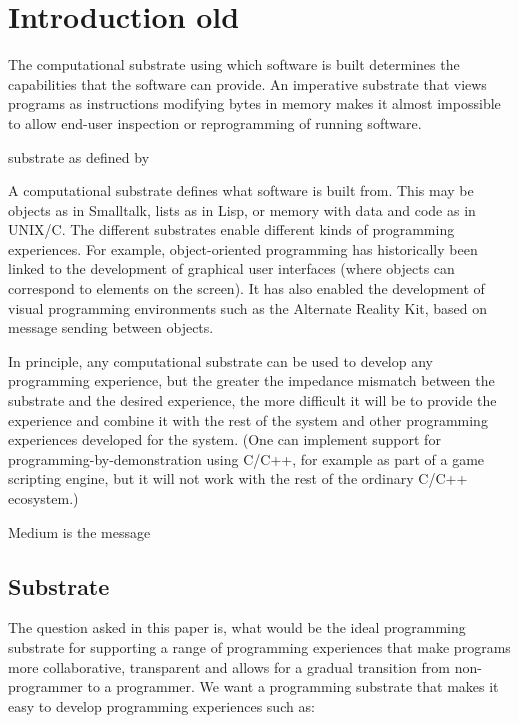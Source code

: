 \documentclass[sigconf,anonymous,screen]{acmart}
\begin{document}
\newpage

\section{Introduction old}

The computational substrate using which software is built determines the capabilities that the
software can provide. An imperative substrate that views programs as instructions modifying
bytes in memory makes it almost impossible to allow end-user inspection or reprogramming of
running software.

substrate as defined by \cite{jakubovic-2022-ladder}


A computational substrate defines what software is built from. This may be objects as in
Smalltalk, lists as in Lisp, or memory with data and code as in UNIX/C.
The different substrates enable different kinds of programming experiences.
For example, object-oriented programming has historically been linked to the development
of graphical user interfaces (where objects can correspond to elements on the screen).
It has also enabled the development of visual programming environments such as the Alternate
Reality Kit, based on message sending between objects.

In principle, any computational substrate can be used to develop any programming experience,
but the greater the impedance mismatch between the substrate and the desired experience,
the more difficult it will be to provide the experience and combine it with the rest of the
system and other programming experiences developed for the system. (One can implement support
for programming-by-demonstration using C/C++, for example as part of a game scripting engine,
but it will not work with the rest of the ordinary C/C++ ecosystem.)


Medium is the message

\subsection{Substrate}

The question asked in this paper is, what would be the ideal programming substrate
for supporting a range of programming experiences that make programs more
collaborative, transparent and allows for a gradual transition from non-programmer
to a programmer. We want a programming substrate that makes it easy to develop
programming experiences such as:
\end{document}
